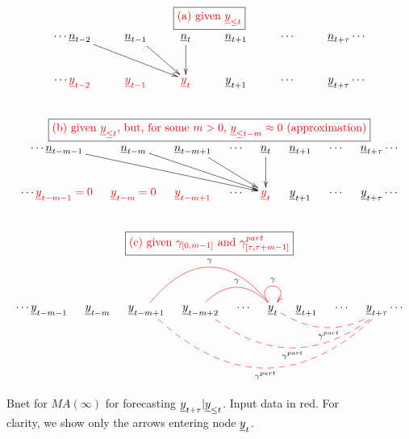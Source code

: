 \newcommand{\yLt}[0]
{given $\rvy_{\leq t}$}


\newcommand{\ynAPPROX}[0]
{given $\rvy_{\leq t}$, but,
 for some $m>0$,
$\rvy_{\leq t-m}\approx 0$ (approximation)}

\newcommand{\gammaEXACT}[0]
{given $\gamma_{[0,m-1]}$
and $\gamma^{part}_{[\tau,\tau+ m-1]}$}


\begin{figure}[h!]
$$
\begin{array}{c}
\fbox{\text{\color{red}(a) \yLt}}
\\
\xymatrix{
\cdots
\rvn_{t-2}\ar[drr]
&\rvn_{t-1}\ar[dr]
&\rvn_t\ar[d]
&\rvn_{t+1}
&\cdots
&\rvn_{t+\tau}
\cdots
\\
\cdots
{\color{red}\rvy_{t-2}}
&{\color{red}\rvy_{t-1}}
&{\color{red}\rvy_t}
&\rvy_{t+1}
&\cdots
&\rvy_{t+\tau}
\cdots
}
\\
\\
\\
\fbox{\text{\color{red}(b) \ynAPPROX}}
\\
\xymatrix@C=10px{
\cdots
\rvn_{t-m-1}\ar[drrrr]
&\rvn_{t-m}\ar[drrr]
&\rvn_{t-m+1}\ar[drr]
&\cdots
&\rvn_{t}\ar[d]
&\rvn_{t+1}
&\cdots
&\rvn_{t+\tau}
\cdots
\\
\cdots
{\color{red}\rvy_{t-m-1}=0}
&{\color{red}\rvy_{t-m}=0}
&{\color{red}\rvy_{t-m+1}}
&\cdots
&{\color{red}\rvy_{t}}
&\rvy_{t+1}
&\cdots
&\rvy_{t+\tau}
\cdots
}
\\
\\
\\
\fbox{\color{red}(c) \gammaEXACT}
\\
\xymatrix@C=10px{
\cdots
\rvy_{t-m-1}
&\rvy_{t-m}
&\rvy_{t-m+1}
&\rvy_{t-m+2}
&\cdots
&\rvy_{t}\ar@[red]@/_3pc/@{-}[lll]_\gamma
\ar@[red]@/_1.5pc/@{-}[ll]_\gamma
\ar@[red]@(ul,ur)[]^\gamma
&\rvy_{t+1}
&\cdots
&\rvy_{t+\tau}
\ar@[red]@/^1.5pc/@{--}[lll]^{\gamma^{part}}
\ar@[red]@/^3pc/@{--}[lllll]^{\gamma^{part}}
\ar@[red]@/^4.5pc/@{--}[llllll]^{\gamma^{part}}
\cdots
}
\end{array}
$$
\caption{Bnet for 
$MA(\infty)$
for forecasting
${\underline{y}}_{t+\tau}|{\underline{y}}_{\leq t}$.
Input data in red.
For clarity, we show
 only the arrows entering
node ${\underline{y}}_t$.}
\label{fig-forecasting-cases}
\end{figure}

